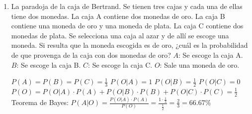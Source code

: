 \documentclass[a4paper, 12pt]{article}
\newcommand{\Pspace}{0.5cm}
\newcommand{\Aspace}{0.2cm}
\begin{document}
\begin{enumerate}
    \vspace{\Pspace}
    \item La paradoja de la caja de Bertrand. Se tienen tres cajas y cada una de ellas tiene dos monedas. La caja A contiene dos monedas de oro. La caja B contiene una moneda de oro y una moneda de plata. La caja C contiene dos monedas de plata. Se selecciona una caja al azar y de allí se escoge una moneda. Si resulta que la moneda escogida es de oro, ¿cuál es la probabilidad de que provenga de la caja con dos monedas de oro?
    \newline $A$: Se escoge la caja A.
    \newline $B$: Se escoge la caja B.
    \newline $C$: Se escoge la caja C.
    \newline $O$: Sale una moneda de oro.
    \vspace{\Aspace} \par
    { \color{azul} 
        $P(A) = P(B) = P(C) = \frac{1}{3}$
        \newline $P(O | A) = 1$
        \newline $P(O | B) = \frac{1}{2}$
        \newline $P(O | C) = 0$
        \newline $P(O) = P(O | A) \cdot P(A) + P(O | B) \cdot P(B) + P(O | C) \cdot P(C) = \frac{1}{2}$
        \newline Teorema de Bayes: $P(A | O) = \frac{P(O | A) \cdot P(A)}{P(O)} = \frac{1 \cdot \frac{1}{3}}{\frac{1}{2}} = \frac{2}{3} = 66{.}67\%$
    }
\end{enumerate}
\end{document}
